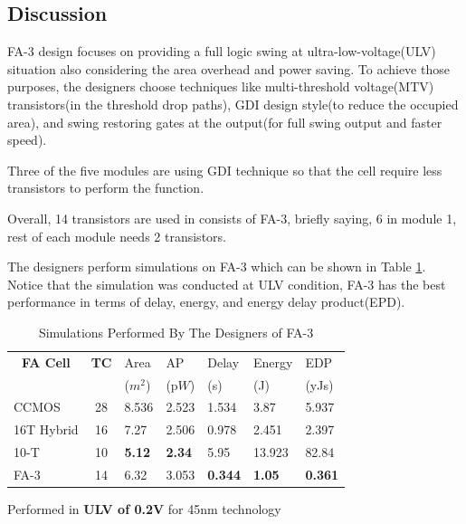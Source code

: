 \documentclass[conference]{IEEEtran}
\begin{document}
\subsection{Discussion}

FA-3 design focuses on providing a full logic swing at ultra-low-voltage(ULV) situation also considering the area overhead and power saving.
To achieve those purposes, the designers choose techniques like multi-threshold voltage(MTV) transistors(in the threshold drop paths),
GDI design style(to reduce the occupied area), and swing restoring gates at the output(for full swing output and faster speed).

Three of the five modules are using GDI technique so that the cell require less transistors to perform the function.

Overall, 14 transistors are used in consists of FA-3, briefly saying, 6 in module 1, rest of each module needs 2 transistors.

The designers perform simulations on FA-3 which can be shown in Table \ref{tb:fa3-comparison}.
Notice that the simulation was conducted at ULV condition, FA-3 has the best performance in terms of delay, energy, and energy delay product(EPD).

\begin{table}[!ht]
	\centering
	\begin{threeparttable}[b]
		\renewcommand{\arraystretch}{1.3}
		\caption{Simulations Performed By The Designers of FA-3}
		\begin{tabular}{l c *{5}{l}}
			\hline
			\multicolumn{1}{c}{\bfseries FA Cell } & \bfseries TC & Area                  & AP             & Delay            & Energy         & EDP             \\
			                                       &              & (\textmugreek\(m^2\)) & (p\(W\))       & (\textmugreek s) & (\textalpha J) & (yJs)           \\
			\hline
			\cite{weste2015cmos} CCMOS             & 28           & 8.536                 & 2.523          & 1.534            & 3.87           & 5.937           \\
			\cite{15484823} 16T Hybrid             & 16           & 7.27                  & 2.506          & 0.978            & 2.451          & 2.397           \\
			\cite{20194307582820} 10-T             & 10           & \bfseries 5.12        & \bfseries 2.34 & 5.95             & 13.923         & 82.84           \\
			\cite{18743001} FA-3                   & 14           & 6.32                  & 3.053          & \bfseries 0.344  & \bfseries 1.05 & \bfseries 0.361 \\
			\hline
		\end{tabular}
		\begin{tablenotes}
			\item Performed in \textbf{ULV of 0.2V} for 45nm technology
		\end{tablenotes}
		\label{tb:fa3-comparison}
	\end{threeparttable}
\end{table}
\end{document}
